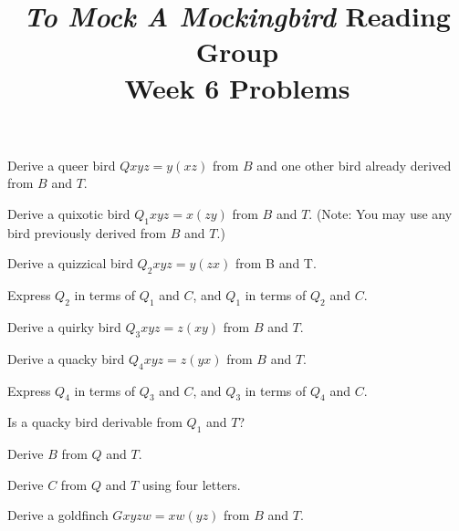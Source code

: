 \documentclass[12pt, letterpaper]{article}
\title{\emph{To Mock A Mockingbird} Reading Group\\Week 6 Problems}
\begin{document}
\maketitle

\begin{prob}{11.37}  
Derive a queer bird $Qxyz = y(xz)$ from $B$ and one other bird already derived from $B$ and $T$.
\end{prob}

\begin{prob}{11.38}  
Derive a quixotic bird $Q_1xyz = x(zy)$ from $B$ and $T$. (Note: You may use any bird previously derived from $B$ and $T$.)
\end{prob}

\begin{prob}{11.39}  
Derive a quizzical bird $Q_2xyz = y(zx)$ from B and T.
\end{prob}

\begin{prob}{11.40}  
Express $Q_2$ in terms of $Q_1$ and $C$, and $Q_1$ in terms of $Q_2$ and $C$.
\end{prob}

\begin{prob}{11.41}  
Derive a quirky bird $Q_3xyz = z(xy)$ from $B$ and $T$.
\end{prob}

\begin{prob}{11.42}  
Derive a quacky bird $Q_4xyz = z(yx)$ from $B$ and $T$.
\end{prob}

\begin{prob}{11.43}  
Express $Q_4$ in terms of $Q_3$ and $C$, and $Q_3$ in terms of $Q_4$ and $C$.
\end{prob}

\begin{prob}{11.44}  
Is a quacky bird derivable from $Q_1$ and $T$?
\end{prob}

\begin{prob}{11.45}  
Derive $B$ from $Q$ and $T$.
\end{prob}

\begin{prob}{11.46}  
Derive $C$ from $Q$ and $T$ using four letters.
\end{prob}

\begin{prob}{11.47}  
Derive a goldfinch $Gxyzw = xw(yz)$ from $B$ and $T$.
\end{prob}
\end{document}
